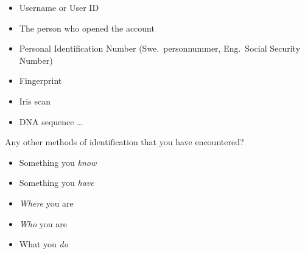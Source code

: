 \documentclass{beamer}
\begin{document}
\begin{frame}
  \begin{example}
    \begin{itemize}
      \item Username or User ID
      \item The person who opened the account
      \item Personal Identification Number (Swe.\ personnummer, Eng.\ Social 
        Security Number)

        \pause{}

      \item Fingerprint
      \item Iris scan
      \item DNA sequence \dots
    \end{itemize}
  \end{example}

  \pause{}

  \begin{exercise}
    Any other methods of identification that you have encountered?
  \end{exercise}
\end{frame}

\begin{frame}
  \begin{example}
    \begin{itemize}
      \item Something you \emph{know}

        \pause{}

      \item Something you \emph{have}

        \pause{}

      \item \emph{Where} you are

        \pause{}

      \item \emph{Who} you are
      \item What you \emph{do}
    \end{itemize}
  \end{example}
\end{frame}
\end{document}
